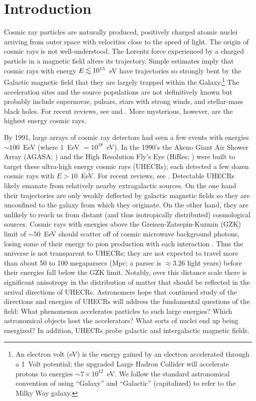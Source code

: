 \section{Introduction}

Cosmic ray particles are naturally produced, positively charged atomic nuclei
arriving from outer space with velocities close to the speed of light.  
The origin of cosmic rays is not well-understood. The Lorentz force
experienced by a charged particle in a magnetic field alters its trajectory.
Simple estimates imply that cosmic rays with energy $E \lta 10^{15}$~eV 
have trajectories so strongly bent
by the Galactic magnetic field that they are largely trapped within the
Galaxy.\footnote{An electron volt (eV) is the energy gained by an
electron accelerated through a 1~Volt potential; the upgraded Large Hadron
Collider will accelerate protons to energies $\sim 7\times 10^{12}$~eV.  We
follow the standard astronomical convention of using ``Galaxy'' and
``Galactic'' (capitalized) to refer to the Milky Way galaxy.}
The acceleration sites and the source populations are not definitively known
but probably include supernovae, pulsars, stars with strong winds, and
stellar-mass black holes.  For recent reviews, see \citet{Cronin99} and \citet{Hillas06}.
More mysterious, however, are the highest energy cosmic rays.

By 1991, large arrays of cosmic ray detectors had seen a few events with
energies $\sim 100$~EeV (where 1~EeV $=10^{18}$~eV). In the 1990's the Akeno
Giant Air Shower Array (AGASA; \cite{1992APh.....1...27C}) and the High
Resolution Fly's Eye (HiRes; \cite{2002NIMPA.482..457B}) were built to
target these ultra-high energy cosmic rays (UHECRs); each detected a few
dozen cosmic rays with $E>10$~EeV.  For recent reviews, see
\cite{KO11-UHECRs,LS11-UHECRs}.
Detectable UHECRs likely emanate from relatively nearby extragalactic
sources. On the one hand their trajectories are only weakly deflected by
galactic magnetic fields so they are unconfined to the galaxy from which
they originate.  On the other hand, they are unlikely to reach us from
distant (and thus isotropically distributed) cosmological sources.  Cosmic
rays with energies above the Greisen-Zatsepin-Kuzmin (GZK) limit of $\sim
50$~EeV  should scatter off of cosmic microwave background photons, losing
some of their energy to pion production with each interaction
\cite{G66-GZK,ZK66-GZK}.  Thus the universe is not transparent to UHECRs;
they are not expected to travel more than about 50 to 100 megaparsecs (Mpc;
a parsec is $\approx 3.26$ light years)
before their energies fall below the GZK limit. Notably, over this distance
scale there is significant anisotropy in the distribution of matter that
should be reflected in the arrival directions of UHECRs. Astronomers hope
that continued study of the directions and energies of UHECRs will address
the fundamental questions of the field: What phenomenon accelerates
particles to such large energies?  Which astronomical objects host the
accelerators?  What sorts of nuclei end up being energized?  In addition,
UHECRs probe galactic and intergalactic magnetic fields.


